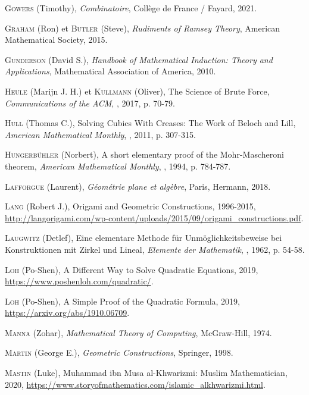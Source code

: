 \begin{thebibliography}{99}
\textsc{Gowers} (Timothy), \emph{Combinatoire}, Collège de France / Fayard, 2021.

  \textsc{Graham} (Ron) et \textsc{Butler} (Steve), \emph{Rudiments of Ramsey Theory}, American Mathematical Society, 2015.


  \textsc{Gunderson} (David S.), \emph{Handbook of Mathematical Induction: Theory and Applications}, Mathematical Association of America, 2010.

  \textsc{Heule} (Marijn J. H.) et \textsc{Kullmann} (Oliver), \og The Science of Brute Force\fg, \emph{Communications of the ACM}, , 2017, p. 70-79.


  \textsc{Hull} (Thomas C.), \og Solving Cubics With Creases: The Work of {Beloch} and {Lill}\fg, \emph{American Mathematical Monthly}, , 2011, p. 307-315.

  \textsc{Hungerbühler} (Norbert), \og A short elementary proof of the {Mohr-Mascheroni} theorem\fg, \emph{American Mathematical Monthly}, , 1994, p. 784-787.


\textsc{Lafforgue} (Laurent), \emph{Géométrie plane et algèbre}, Paris, Hermann, 2018.

  \textsc{Lang} (Robert J.), \og Origami and Geometric Constructions\fg, 1996-2015, \url{http://langorigami.com/wp-content/uploads/2015/09/origami_constructions.pdf}.

  \textsc{Laugwitz} (Detlef), \og Eine elementare {Methode} f\"{u}r {Unm\"{o}glichkeitsbeweise} bei {Konstruktionen} mit {Zirkel} und {Lineal}\fg, \emph{Elemente der Mathematik}, , 1962, p. 54-58.

  \textsc{Loh} (Po-Shen), \og A Different Way to Solve Quadratic Equations\fg, 2019, \url{https://www.poshenloh.com/quadratic/}.


  \textsc{Loh} (Po-Shen), \og A Simple Proof of the Quadratic Formula\fg, 2019, \url{https://arxiv.org/abs/1910.06709}.


  \textsc{Manna} (Zohar), \emph{Mathematical Theory of Computing}, McGraw-Hill, 1974.



  \textsc{Martin} (George E.), \emph{Geometric Constructions}, Springer, 1998.


  \textsc{Mastin} (Luke), \og Muhammad ibn {Musa al-Khwarizmi}: {Muslim Mathematician}\fg, 2020, \url{https://www.storyofmathematics.com/islamic_alkhwarizmi.html}.



\end{thebibliography}
